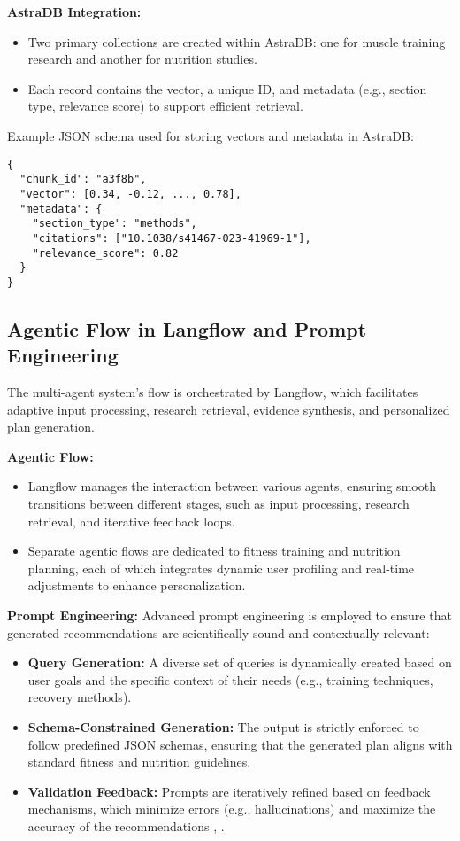 \documentclass[conference]{IEEEtran}
\begin{document}
\textbf{AstraDB Integration:}
\begin{itemize}
    \item Two primary collections are created within AstraDB: one for muscle training research and another for nutrition studies.
    \item Each record contains the vector, a unique ID, and metadata (e.g., section type, relevance score) to support efficient retrieval.
\end{itemize}

Example JSON schema used for storing vectors and metadata in AstraDB:
\begin{verbatim}
{
  "chunk_id": "a3f8b",
  "vector": [0.34, -0.12, ..., 0.78],
  "metadata": {
    "section_type": "methods",
    "citations": ["10.1038/s41467-023-41969-1"],
    "relevance_score": 0.82
  }
}
\end{verbatim}

\subsection{Agentic Flow in Langflow and Prompt Engineering}
The multi-agent system’s flow is orchestrated by Langflow, which facilitates adaptive input processing, research retrieval, evidence synthesis, and personalized plan generation.

\textbf{Agentic Flow:}
\begin{itemize}
    \item Langflow manages the interaction between various agents, ensuring smooth transitions between different stages, such as input processing, research retrieval, and iterative feedback loops.
    \item Separate agentic flows are dedicated to fitness training and nutrition planning, each of which integrates dynamic user profiling and real-time adjustments to enhance personalization.
\end{itemize}

\textbf{Prompt Engineering:}
Advanced prompt engineering is employed to ensure that generated recommendations are scientifically sound and contextually relevant:
\begin{itemize}
    \item \textbf{Query Generation:} A diverse set of queries is dynamically created based on user goals and the specific context of their needs (e.g., training techniques, recovery methods).
    \item \textbf{Schema-Constrained Generation:} The output is strictly enforced to follow predefined JSON schemas, ensuring that the generated plan aligns with standard fitness and nutrition guidelines.
    \item \textbf{Validation Feedback:} Prompts are iteratively refined based on feedback mechanisms, which minimize errors (e.g., hallucinations) and maximize the accuracy of the recommendations \cite{11}, \cite{12}.
\end{itemize}
\end{document}
